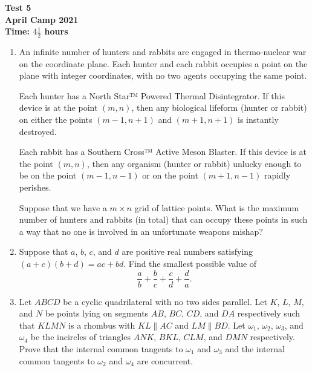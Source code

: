 \documentclass{article}
\begin{document}
\thispagestyle{empty}

\begin{center}
  \textbf{\Large Test 5}
  \\ \vspace{1em}
  \textbf{\large April Camp 2021}
  \\ \vspace{1em}
  \textbf{\large Time: $4\frac{1}{2}$ hours}
\end{center}

\vfill

\begin{enumerate}[leftmargin=0pt, itemsep=18pt]

\item
An infinite number of hunters and rabbits are engaged in thermo-nuclear war on the coordinate plane. Each hunter and each rabbit occupies a point on the plane with integer coordinates, with no two agents occupying the same point. 

Each hunter has a North Star™ Powered Thermal Disintegrator. If this device is at the point $(m, n)$, then any biological lifeform (hunter or rabbit) on either the points $(m - 1, n + 1)$ and $(m + 1, n + 1)$ is instantly destroyed.

Each rabbit has a Southern Cross™ Active Meson Blaster. If this device is at the point $(m, n)$, then any organism (hunter or rabbit) unlucky enough to be on the point $(m - 1, n - 1)$ or on the point $(m + 1, n - 1)$ rapidly perishes.

Suppose that we have a $m \times n$ grid of lattice points. What is the maximum number of hunters and rabbits (in total) that can occupy these points in such a way that no one is involved in an unfortunate weapons mishap?


\item %
Suppose that $a$, $b$, $c$, and $d$ are positive real numbers satisfying $(a+c) (b+d) = ac +bd$.
Find the smallest possible value of
\[ \frac{a}{b} +\frac{b}{c} +\frac{c}{d} +\frac{d}{a}. \]


\item %
Let $ABCD$ be a cyclic quadrilateral with no two sides parallel.
Let $K$, $L$, $M$, and $N$ be points lying on segments $AB$, $BC$, $CD$, and $DA$ respectively such that $KLMN$ is a rhombus with $KL \parallel AC$ and $LM \parallel BD$.
Let $\omega_1$, $\omega_2$, $\omega_3$, and $\omega_4$ be the incircles of triangles $ANK$, $BKL$, $CLM$, and $DMN$ respectively.
Prove that the internal common tangents to $\omega_1$ and $\omega_3$ and the internal common tangents to $\omega_2$ and $\omega_4$ are concurrent.

\end{enumerate}
\end{document}
